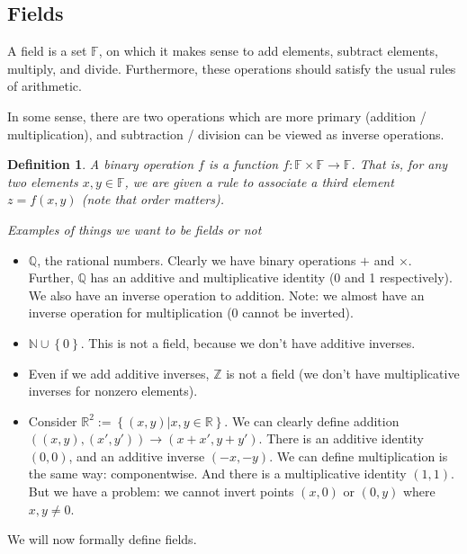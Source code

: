 \documentclass[12pt]{article}
\newtheorem*{definition}{Definition}
\newcommand{\RR}{\mathbb{R}}
\newcommand{\FF}{\mathbb{F}}
\begin{document}
\subsection{Fields}

A field is a set $\FF$, on which it makes sense to add elements, subtract elements, multiply, and divide. Furthermore, these operations should satisfy the usual rules of arithmetic.

In some sense, there are two operations which are more primary (addition / multiplication), and subtraction / division can be viewed as inverse operations. \\

\begin{definition} 
  A binary operation $f$ is a function $f: \FF \times \FF \to \FF$.  That is, for any two elements $x, y \in \FF$, we are given a rule to associate a third element $z = f(x, y)$ (note that order matters).
\end{definition}

{\it Examples of things we want to be fields or not}

\begin{itemize}
  \item $\mathbb{Q}$, the rational numbers.  Clearly we have binary operations $+$ and $\times$.  Further, $\mathbb{Q}$ has an additive and multiplicative identity (0 and 1 respectively).  We also have an inverse operation to addition.  Note: we almost have an inverse operation for multiplication (0 cannot be inverted).

  \item $\mathbb{N} \cup \left\{ 0 \right\}$.  This is not a field, because we don't have additive inverses.

  \item Even if we add additive inverses, $\mathbb{Z}$ is not a field (we don't have multiplicative inverses for nonzero elements).

  \item Consider $\RR^2 := \left\{ (x, y) | x, y \in \RR \right\}$.  We can clearly define addition $((x, y), (x', y')) \to (x + x', y + y')$.  There is an additive identity $(0, 0)$, and an additive inverse $(-x, -y)$.  We can define multiplication is the same way: componentwise.  And there is a multiplicative identity $(1, 1)$.  But we have a problem: we cannot invert points $(x, 0)$ or $(0, y)$ where $x, y \neq 0$.
\end{itemize}

We will now formally define fields. \\
\end{document}
